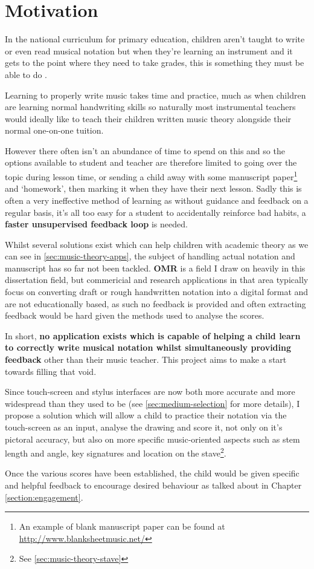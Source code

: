 \section{Motivation}

In the national curriculum for primary education, children aren't taught to write or even read musical notation \parencite{Attai5} but when they're learning an instrument and it gets to the point where they need to take grades, this is something they must be able to do \parencite{whyMusicTheory}.

Learning to properly write music takes time and practice, much as when children are learning normal handwriting skills so naturally most instrumental teachers would ideally like to teach their children written music theory alongside their normal one-on-one tuition.

However there often isn't an abundance of time to spend on this and so the options available to student and teacher are therefore limited to going over the topic during lesson time, or sending a child away with some manuscript paper\footnote{An example of blank manuscript paper can be found at \url{http://www.blanksheetmusic.net/}} and `homework', then marking it when they have their next lesson. Sadly this is often a very ineffective method of learning as without guidance and feedback on a regular basis, it's all too easy for a student to accidentally reinforce bad habits, a \textbf{faster unsupervised feedback loop} is needed.

Whilst several solutions exist which can help children with academic theory as we can see in \cref{sec:music-theory-apps}, the subject of handling actual notation and manuscript has so far not been tackled. \textbf{\acrfull{OMR}} is a field I draw on heavily in this dissertation field, but commericial and research applications in that area typically focus on converting draft or rough handwritten notation into a digital format and are not educationally based, as such no feedback is provided and often extracting feedback would be hard given the methods used to analyse the scores.

In short, \textbf{no application exists which is capable of helping a child learn to correctly write musical notation whilst simultaneously providing feedback} other than their music teacher. This project aims to make a start towards filling that void.

Since touch-screen and stylus interfaces are now both more accurate and more widespread than they used to be (see \cref{sec:medium-selection} for more details), I propose a solution which will allow a child to practice their notation via the touch-screen as an input, analyse the drawing and score it, not only on it's pictoral accuracy, but also on more specific music-oriented aspects such as stem length and angle, key signatures and location on the stave\footnote{See \cref{sec:music-theory-stave}}.

Once the various scores have been established, the child would be given specific and helpful feedback to encourage desired behaviour as talked about in Chapter \cref{section:engagement}.
